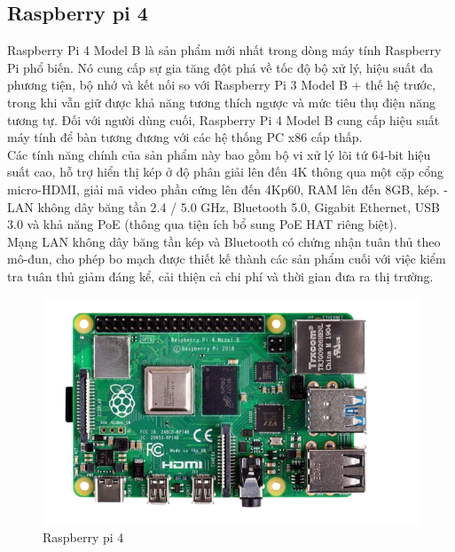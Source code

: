 \documentclass{report}
\begin{document}
\subsection{Raspberry pi 4}
Raspberry Pi 4 Model B là sản phẩm mới nhất trong dòng máy tính Raspberry Pi phổ biến. Nó cung cấp sự gia tăng đột phá về tốc độ bộ xử lý, hiệu suất đa phương tiện, bộ nhớ và kết nối so với Raspberry Pi 3 Model B + thế hệ trước, trong khi vẫn giữ được khả năng tương thích ngược và mức tiêu thụ điện năng tương tự. Đối với người dùng cuối, Raspberry Pi 4 Model B cung cấp hiệu suất máy tính để bàn tương đương với các hệ thống PC x86 cấp thấp. \\

Các tính năng chính của sản phẩm này bao gồm bộ vi xử lý lõi tứ 64-bit hiệu suất cao, hỗ trợ hiển thị kép ở độ phân giải lên đến 4K thông qua một cặp cổng micro-HDMI, giải mã video phần cứng lên đến 4Kp60, RAM lên đến 8GB, kép. - LAN không dây băng tần 2.4 / 5.0 GHz, Bluetooth 5.0, Gigabit Ethernet, USB 3.0 và khả năng PoE (thông qua tiện ích bổ sung PoE HAT riêng biệt). \\

Mạng LAN không dây băng tần kép và Bluetooth có chứng nhận tuân thủ theo mô-đun, cho phép bo mạch được thiết kế thành các sản phẩm cuối với việc kiểm tra tuân thủ giảm đáng kể, cải thiện cả chi phí và thời gian đưa ra thị trường. 
\begin{figure}[h]
	\centering
	\includegraphics[scale = 0.5]{fig39.png}
	\caption{Raspberry pi 4}
	\label{fig:Graph39}
\end{figure}
\end{document}
